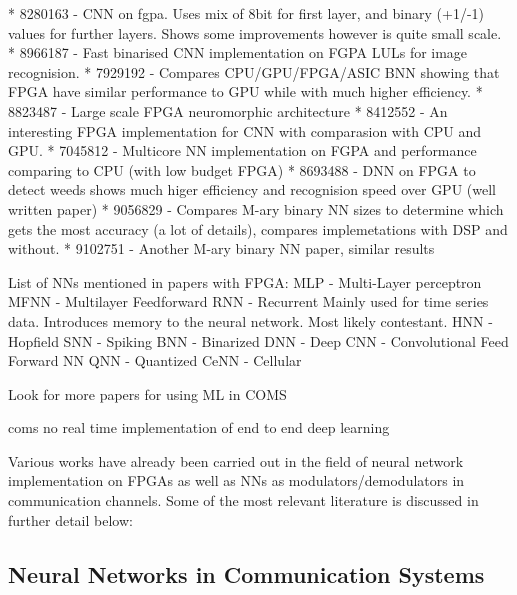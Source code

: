 * 8280163 - CNN on fgpa. Uses mix of 8bit for first layer, and binary (+1/-1) values for further layers. Shows some improvements however is quite small scale.
* 8966187 - Fast binarised CNN implementation on FGPA LULs for image recognision.
* 7929192 - Compares CPU/GPU/FPGA/ASIC BNN showing that FPGA have similar performance to GPU while with much higher efficiency.
* 8823487 - Large scale FPGA neuromorphic architecture
* 8412552 - An interesting FPGA implementation for CNN with comparasion with CPU and GPU.
* 7045812 - Multicore NN implementation on FGPA and performance comparing to CPU (with low budget FPGA)
* 8693488 - DNN on FPGA to detect weeds shows much higer efficiency and recognision speed over GPU (well written paper)
* 9056829 - Compares M-ary binary NN sizes to determine which gets the most accuracy (a lot of details), compares implemetations with DSP and without.
* 9102751 - Another M-ary binary NN paper, similar results

List of NNs mentioned in papers with FPGA:
MLP - Multi-Layer perceptron 
MFNN - Multilayer Feedforward
RNN - Recurrent 
    Mainly used for time series data. Introduces memory to the neural network. Most likely contestant.
HNN - Hopfield
SNN - Spiking
BNN - Binarized
DNN - Deep
CNN - Convolutional
Feed Forward NN
QNN - Quantized 
CeNN - Cellular


Look for more papers for using ML in COMS


coms no real time implementation of end to end deep learning

\fi

Various works have already been carried out in the field of neural network implementation on FPGAs as well as NNs as modulators/demodulators in communication channels. Some of the most relevant literature is discussed in further detail below:

\subsection{Neural Networks in Communication Systems}

